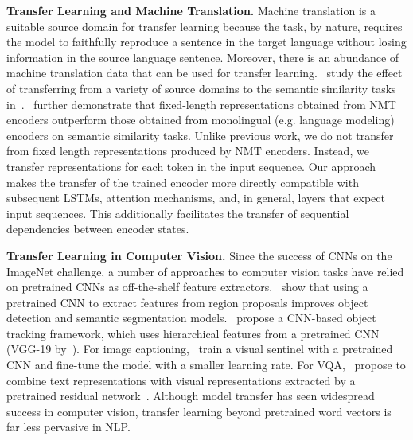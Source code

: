 \textbf{Transfer Learning and Machine Translation.}
Machine translation is a suitable source domain for transfer learning because the task,
by nature, 
requires the model to faithfully reproduce a sentence in the target language without losing information in the source language sentence.
Moreover, there is an abundance of machine translation data that can be used for transfer learning.~\citet{Hill2016LearningDR} study the effect of transferring from a variety of source domains to the semantic similarity tasks in~\citet{Agirre2014SemEval2014T1}.~\citet{Hill2017} further demonstrate that fixed-length representations obtained from NMT encoders outperform those obtained from monolingual (e.g. language modeling) encoders on semantic similarity tasks.
Unlike previous work, 
we do not transfer from fixed length representations produced by NMT encoders. 
Instead, we transfer representations for each token in the input sequence.
Our approach makes the transfer of the trained encoder more directly compatible with subsequent LSTMs, attention mechanisms, and, in general, layers that expect input sequences.
This additionally facilitates the transfer of sequential dependencies between encoder states.

\textbf{Transfer Learning in Computer Vision.} 
Since the success of CNNs on the ImageNet challenge, 
a number of approaches to computer vision tasks have relied on pretrained CNNs as off-the-shelf feature extractors.~\citet{girshick2014rich} show that using a pretrained CNN to extract features from region proposals improves object detection and semantic segmentation models.~\citet{qi2016hedged} propose a CNN-based object tracking framework, 
which uses hierarchical features from a pretrained CNN (VGG-19 by~\citet{simonyan2014very}).
For image captioning,~\citet{lu2016knowing} train a visual sentinel with a pretrained CNN and fine-tune the model with a smaller learning rate.
For VQA,~\citet{fukui2016multimodal} propose to combine text representations with visual representations extracted by a pretrained residual network~\citep{he2016deep}.
Although model transfer has seen widespread success in computer vision, 
transfer learning beyond pretrained word vectors is far less pervasive in NLP.
